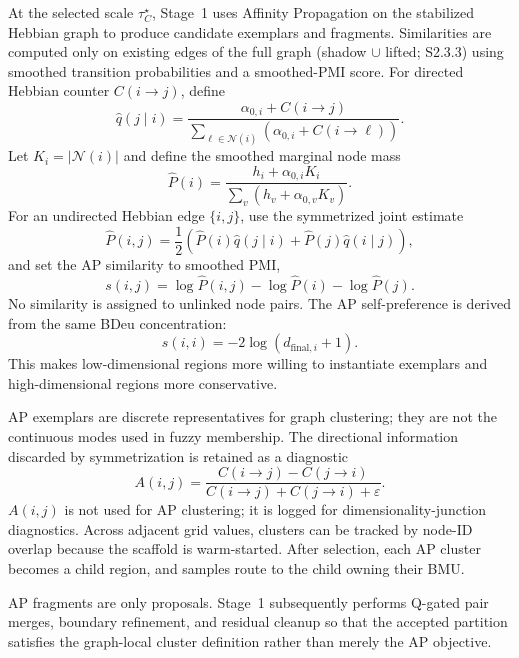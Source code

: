 \documentclass[11pt]{article}
\begin{document}
At the selected scale $\tau_C^\star$, Stage~1 uses Affinity Propagation on the
stabilized Hebbian graph to produce candidate exemplars and fragments.
Similarities are computed only on existing edges of the full graph (shadow
$\cup$ lifted; S2.3.3) using smoothed transition probabilities and a
smoothed-PMI score. For directed Hebbian counter $C(i\to j)$, define
\[
\widehat q(j\mid i)
=
\frac{\alpha_{0,i}+C(i\to j)}
{\sum_{\ell\in\mathcal N(i)}(\alpha_{0,i}+C(i\to\ell))}.
\]
Let $K_i=|\mathcal N(i)|$ and define the smoothed marginal node mass
\[
\widehat P(i)
=
\frac{h_i+\alpha_{0,i}K_i}
{\sum_v(h_v+\alpha_{0,v}K_v)}.
\]
For an undirected Hebbian edge $\{i,j\}$, use the symmetrized joint estimate
\[
\widehat P(i,j)
=
\frac12\left(\widehat P(i)\widehat q(j\mid i)
+\widehat P(j)\widehat q(i\mid j)\right),
\]
and set the AP similarity to smoothed PMI,
\[
s(i,j)
=
\log\widehat P(i,j)-\log\widehat P(i)-\log\widehat P(j).
\]
No similarity is assigned to unlinked node pairs. The AP self-preference is derived from the same BDeu concentration:
\[
s(i,i)=-2\log(d_{\mathrm{final},i}+1).
\]
This makes low-dimensional regions more willing to instantiate exemplars and high-dimensional regions more conservative.

AP exemplars are discrete representatives for graph clustering; they are not the continuous modes used in fuzzy membership. The directional information discarded by symmetrization is retained as a diagnostic
\[
A(i,j)
=
\frac{C(i\to j)-C(j\to i)}
{C(i\to j)+C(j\to i)+\varepsilon}.
\]
$A(i,j)$ is not used for AP clustering; it is logged for dimensionality-junction diagnostics. Across adjacent grid values, clusters can be tracked by node-ID overlap because the scaffold is warm-started. After selection, each AP cluster becomes a child region, and samples route to the child owning their BMU.

AP fragments are only proposals. Stage~1 subsequently performs Q-gated pair
merges, boundary refinement, and residual cleanup so that the accepted
partition satisfies the graph-local cluster definition rather than merely the AP
objective.
\end{document}
